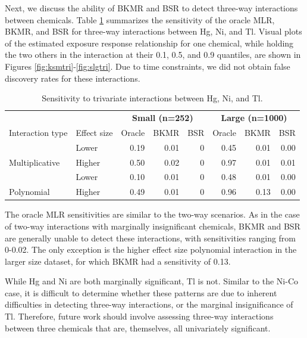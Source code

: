 \documentclass[12pt, twoside]{amherstthesis}
\begin{document}
Next, we discuss the ability of BKMR and BSR to detect three-way interactions between chemicals. Table \ref{tab:threewaysens} summarizes the sensitivity of the oracle MLR, BKMR, and BSR for three-way interactions between Hg, Ni, and Tl. Visual plots of the estimated exposure response relationship for one chemical, while holding the two others in the interaction at their 0.1, 0.5, and 0.9 quantiles, are shown in Figures \ref{fig:ksmtri}-\ref{fig:slgtri}. Due to time constraints, we did not obtain false discovery rates for these interactions.
\begin{table}

\caption{\label{tab:threewaysens}Sensitivity to trivariate interactions between Hg, Ni, and Tl.}
\centering
\begin{tabular}[t]{llrrrrrr}
\toprule
\multicolumn{2}{c}{\textbf{ }} & \multicolumn{3}{c}{\textbf{Small (n=252)}} & \multicolumn{3}{c}{\textbf{Large (n=1000)}} \\
\cmidrule(l{3pt}r{3pt}){3-5} \cmidrule(l{3pt}r{3pt}){6-8}
Interaction type & Effect size & Oracle & BKMR & BSR & Oracle & BKMR & BSR\\
\midrule
 & Lower & 0.19 & 0.01 & 0 & 0.45 & 0.01 & 0.00\\

\multirow{-2}{*}{\raggedright\arraybackslash Multiplicative} & Higher & 0.50 & 0.02 & 0 & 0.97 & 0.01 & 0.01\\
\addlinespace
 & Lower & 0.10 & 0.01 & 0 & 0.48 & 0.01 & 0.00\\

\multirow{-2}{*}{\raggedright\arraybackslash Polynomial} & Higher & 0.49 & 0.01 & 0 & 0.96 & 0.13 & 0.00\\
\bottomrule
\end{tabular}
\end{table}
The oracle MLR sensitivities are similar to the two-way scenarios. As in the case of two-way interactions with marginally insignificant chemicals, BKMR and BSR are generally unable to detect these interactions, with sensitivities ranging from 0-0.02. The only exception is the higher effect size polynomial interaction in the larger size dataset, for which BKMR had a sensitivity of 0.13.

While Hg and Ni are both marginally significant, Tl is not. Similar to the Ni-Co case, it is difficult to determine whether these patterns are due to inherent difficulties in detecting three-way interactions, or the marginal insignificance of Tl. Therefore, future work should involve assessing three-way interactions between three chemicals that are, themselves, all univariately significant.
\end{document}
